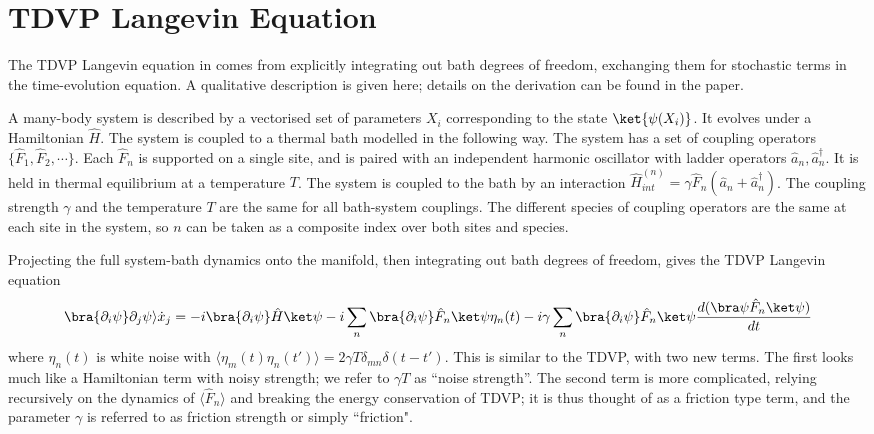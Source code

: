 


\maketitle

\section{TDVP Langevin Equation}

    The TDVP Langevin equation in \cite{Azad2023} comes from explicitly integrating out bath degrees of freedom, exchanging them for stochastic terms in the time-evolution equation. A qualitative description is given here; details on the derivation can be found in the paper.
           
    A many-body system is described by a vectorised set of parameters $X_i$ corresponding to the state $\ket{\psi(X_i)}$. It evolves under a Hamiltonian $\hat{H}$. The system is coupled to a thermal bath modelled in the following way. The system has a set of coupling operators $\{\hat F_1, \hat F_2, \cdots \}$. Each $\hat F_n$ is supported on a single site, and is paired with an independent harmonic oscillator with ladder operators $\hat{a}_n, \hat{a}_n^\dagger$. It is held in thermal equilibrium at a temperature $T$. The system is coupled to the bath by an interaction $\hat{H}_{int}^{(n)}=\gamma \hat F_n(\hat a_n +\hat a_n^\dagger)$. The coupling strength $\gamma$ and the temperature $T$ are the same for all bath-system couplings. The different species of coupling operators are the same at each site in the system, so $n$ can be taken as a composite index over both sites and species. 

    Projecting the full system-bath dynamics onto the manifold, then integrating out bath degrees of freedom, gives the TDVP Langevin equation
    \begin{equation}\label{eq:tdvp-langevin}
       \bra{\partial_i\psi} \partial_j\psi\rangle \dot x_j = -i\bra{\partial_i\psi}\hat H\ket \psi
       -i\sum_n\bra{\partial_i\psi}\hat F_n\ket \psi \eta_n(t)
       -i\gamma \sum_n \bra{\partial_i\psi}\hat F_n\ket \psi \frac{d(\bra\psi\hat F_n\ket\psi)}{dt}
    \end{equation}
    where $\eta_n(t)$ is white noise with $\langle \eta_m(t)\eta_n(t')\rangle = 2\gamma T\delta_{mn}\delta(t-t')$. This is similar to the TDVP, with two new terms. The first looks much like a Hamiltonian term with noisy strength; we refer to $\gamma T$ as ``noise strength''. The second term is more complicated, relying recursively on the dynamics of $\langle \hat F_n \rangle$ and breaking the energy conservation of TDVP; it is thus thought of as a friction type term, and the parameter $\gamma$ is referred to as friction strength or simply ``friction".

